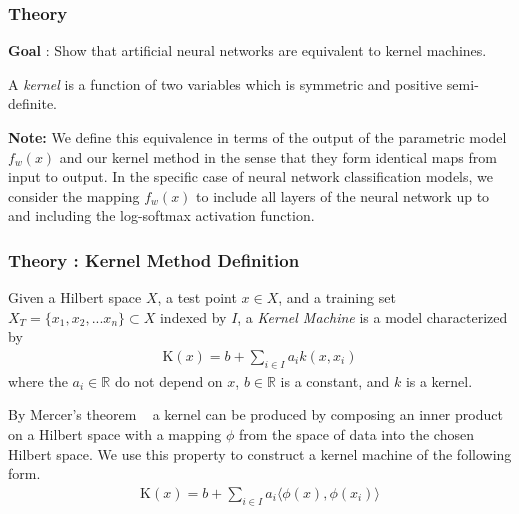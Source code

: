 \begin{frame}
  \frametitle{Theory}
  \textbf{Goal} : Show that artificial neural networks are equivalent
  to kernel machines. \\

\begin{definition}
A \emph{kernel} is a function of two variables which is symmetric and positive semi-definite. 
\end{definition}

\vspace{.4cm}

\textbf{Note:}  We define this equivalence in terms of the output of the parametric model $f_w(x)$ and our kernel method in the sense that they form identical maps from input to output. In the specific case of neural network classification models, we consider the mapping $f_w(x)$ to include all layers of the neural network up to and including the log-softmax activation function. 

\end{frame}

\begin{frame}
  \frametitle{Theory : Kernel Method Definition}
\begin{definition}
Given a Hilbert space $X$, a test point $x \in X$, and a training set $X_T = \{x_1,x_2,...x_n\} \subset X$ indexed by $I$, a \emph{Kernel Machine} is a model characterized by 
\begin{align}
    \text{K}(x) = b + \sum_{i\in I} a_i k(x,x_i)
\end{align}
where the $a_i \in \mathbb{R}$ do not depend on $x$, $b \in \mathbb{R}$ is a constant, and $k$ is a kernel. ~\cite{rasmussen2006gaussian}

By Mercer's theorem ~\cite{ghojogh2021} a kernel can be produced by composing an inner product on a Hilbert space with a mapping $\phi$ from the space of data into the chosen Hilbert space.
We use this property to construct a kernel machine of the following form.
\begin{align}
    \text{K}(x) = b + \sum_{i\in I} a_i \langle \phi(x), \phi(x_i) \rangle
\end{align}
\end{definition}
\end{frame}



